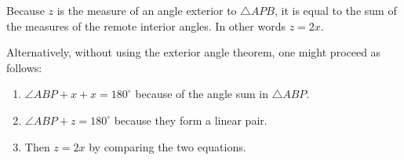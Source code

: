 \documentclass[nooutcomes]{ximera}
\begin{document}
\begin{problem}
Because $z$ is the measure of an angle exterior to $\triangle APB$, it is equal to the sum of the measures of the remote interior angles.  In other words $z=2x$.  

Alternatively, without using the exterior angle theorem, one might proceed as follows:
\begin{enumerate}
\item $\angle ABP + x + x = 180^\circ$ because of the angle sum in $\triangle ABP$.
\item $\angle ABP + z = 180^\circ$ because they form a linear pair. 
\item Then $z = 2x$ by comparing the two equations. 
\end{enumerate}


\end{problem}
\end{document}
